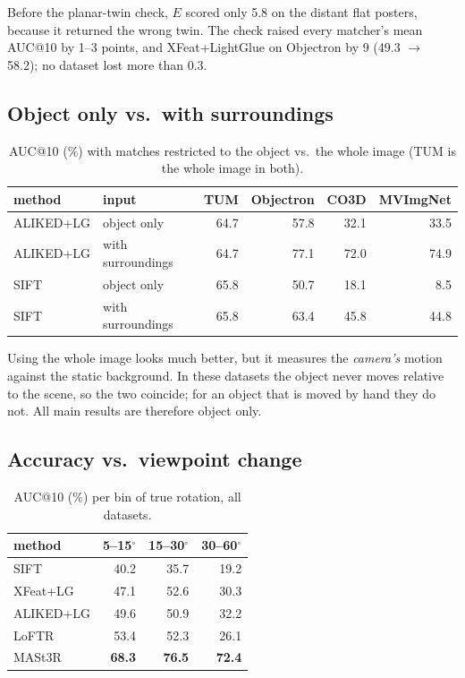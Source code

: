 \documentclass[11pt,a4paper]{article}
\newcommand{\best}[1]{\textbf{#1}}
\begin{document}
Before the planar-twin check, $E$ scored only 5.8 on the distant flat posters, because it returned the
wrong twin. The check raised every matcher's mean AUC@10 by 1--3 points, and XFeat+LightGlue on
Objectron by 9 (49.3 $\to$ 58.2); no dataset lost more than 0.3.

\subsection{Object only vs.\ with surroundings}

\begin{table}[H]
\centering
\small
\begin{tabular}{l l rrrr}
\toprule
method & input & TUM & Objectron & CO3D & MVImgNet \\
\midrule
ALIKED+LG & object only & 64.7 & 57.8 & 32.1 & 33.5 \\
ALIKED+LG & with surroundings & 64.7 & 77.1 & 72.0 & 74.9 \\
SIFT & object only & 65.8 & 50.7 & 18.1 & 8.5 \\
SIFT & with surroundings & 65.8 & 63.4 & 45.8 & 44.8 \\
\bottomrule
\end{tabular}
\caption{AUC@10 (\%) with matches restricted to the object vs.\ the whole image (TUM is the whole image in both).}
\end{table}

Using the whole image looks much better, but it measures the \emph{camera's} motion against the static
background. In these datasets the object never moves relative to the scene, so the two coincide; for an object
that is moved by hand they do not. All main results are therefore object only.

\subsection{Accuracy vs.\ viewpoint change}

\begin{table}[H]
\centering
\small
\begin{tabular}{l rrr}
\toprule
method & 5--15$^\circ$ & 15--30$^\circ$ & 30--60$^\circ$ \\
\midrule
SIFT & 40.2 & 35.7 & 19.2 \\
XFeat+LG & 47.1 & 52.6 & 30.3 \\
ALIKED+LG & 49.6 & 50.9 & 32.2 \\
LoFTR & 53.4 & 52.3 & 26.1 \\
MASt3R & \best{68.3} & \best{76.5} & \best{72.4} \\
\bottomrule
\end{tabular}
\caption{AUC@10 (\%) per bin of true rotation, all datasets.}
\end{table}
\end{document}
